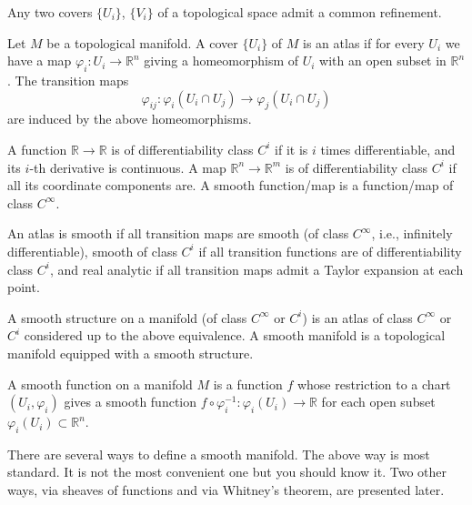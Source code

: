 \medskip\noindent
Any two covers $\{U_i\}$, $\{V_i\}$ of a
topological space admit a common refinement.

\begin{definition}
\label{definition-atlas}
Let $M$ be a topological manifold. A cover
$\{U_i\}$ of $M$ is an atlas if for every
$U_i$ we have a map $\varphi_i:U_i \to
\mathbb{R}^n$ giving a homeomorphism of
$U_i$ with an open subset in $\mathbb{R}^n$.
The transition maps
$$
\varphi_{ij}:\varphi_i(U_i \cap U_j) \to
\varphi_j(U_i \cap U_j)
$$
are induced by the above homeomorphisms.
\end{definition}

\begin{definition}
\label{definition-differentiability-class}
A function $\mathbb{R} \to \mathbb{R}$ is of
differentiability class $C^i$ if it is
$i$ times differentiable, and its $i$-th
derivative is continuous. A map
$\mathbb{R}^n \to \mathbb{R}^m$ is of
differentiability class $C^i$ if all its
coordinate components are. A smooth
function/map is a function/map of class
$C^\infty$.
\end{definition}

\begin{definition}
\label{definition-smooth-atlas}
An atlas is smooth if all transition maps
are smooth (of class $C^\infty$, i.e.,
infinitely differentiable), smooth of class
$C^i$ if all transition functions are of
differentiability class $C^i$, and real
analytic if all transition maps admit a
Taylor expansion at each point.
\end{definition}

\begin{definition}
\label{definition-smooth-structure}
A smooth structure on a manifold (of class
$C^\infty$ or $C^i$) is an atlas of class
$C^\infty$ or $C^i$ considered up to the
above equivalence. A smooth manifold is a
topological manifold equipped with a smooth
structure.
\end{definition}

\begin{definition}
\label{definition-smooth-function-manifold}
A smooth function on a manifold $M$ is a
function $f$ whose restriction to a chart
$(U_i,\varphi_i)$ gives a smooth function
$f \circ \varphi_i^{-1}:\varphi_i(U_i)\to
\mathbb{R}$ for each open subset
$\varphi_i(U_i)\subset \mathbb{R}^n$.
\end{definition}

\medskip\noindent
There are several ways to define a smooth
manifold. The above way is most standard.
It is not the most convenient one but you
should know it. Two other ways, via sheaves
of functions and via Whitney's theorem, are
presented later.

